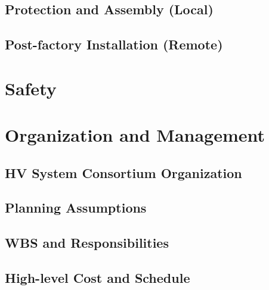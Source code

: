 \subsection{Protection and Assembly (Local)}
\label{sec:fdsp-hv-qc-local}


\subsection{Post-factory Installation (Remote)}
\label{sec:fdsp-hv-qc-remote}





\section{Safety}
\label{sec:fdsp-hv-safety}






\section{Organization and Management}
\label{sec:fdsp-hv-org}

\subsection{HV System Consortium Organization}
\label{sec:fdsp-hv-org-consortium}


\subsection{Planning Assumptions}
\label{sec:fdsp-hv-org-assmp}


\subsection{WBS and Responsibilities}
\label{sec:fdsp-hv-org-wbs}

\subsection{High-level Cost and Schedule}
\label{sec:fdsp-hv-org-cs}














